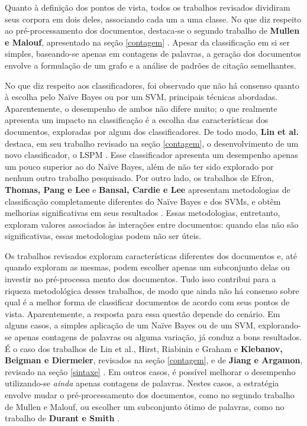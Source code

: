 Quanto à definição dos pontos de vista, todos os trabalhos revisados dividiram seus corpora em dois deles, associando cada um a uma classe. No que diz respeito ao pré-processamento dos documentos, destaca-se o segundo trabalho de \textbf{Mullen e Malouf}, apresentado na seção \ref{contagem} \cite{malouf-taking_sides}. Apesar da classificação em si ser simples, baseando-se apenas em contagens de palavras, a geração dos documentos envolve a formulação de um grafo e a análise de padrões de citação semelhantes. 

No que diz respeito aos classificadores, foi observado que não há consenso quanto à escolha pelo Naïve Bayes ou por um SVM, principais técnicas abordadas. Aparentemente, o desempenho de ambos não difere muito; o que realmente apresenta um impacto na classificação é a escolha das características dos documentos, exploradas por algum dos classificadores. De todo modo, \textbf{Lin et al.} destaca, em seu trabalho revisado na seção \ref{contagem}, o desenvolvimento de um novo classificador, o LSPM \cite{lin-et-al2006}. Esse classificador apresenta um desempenho apenas um pouco superior ao do Naïve Bayes, além de não ter sido explorado por nenhum outro trabalho pesquisado. Por outro lado, os trabalhos de Efron, \textbf{Thomas, Pang e Lee} e \textbf{Bansal, Cardie e Lee} apresentam metodologias de classificação completamente diferentes do Naïve Bayes e dos SVMs, e obtêm melhorias significativas em seus resultados \cite{efron} \cite{get-out-the-vote} \cite{disagree}. Essas metodologias, entretanto, exploram valores associados às interações entre documentos: quando elas não são significativas, essas metodologias podem não ser úteis.  

Os trabalhos revisados exploram características diferentes dos documentos e, até quando exploram as mesmas, podem escolher apenas um subconjunto delas ou investir no pré-processa mento dos documentos. Tudo isso contribui para a riqueza metodológica desses trabalhos, de modo que ainda não há consenso sobre qual é a melhor forma de classificar documentos de acordo com seus pontos de vista. Aparentemente, a resposta para essa questão depende do cenário. Em alguns casos, a simples aplicação de um Naïve Bayes ou de um SVM, explorando-se apenas contagens de palavras ou alguma variação, já conduz a bons resultados. É o caso dos trabalhos de Lin et al., Hirst, Riabinin e Graham e \textbf{Klebanov, Beigman e Diermeier}, revisados na seção \ref{contagem}, e de \textbf{Jiang e Argamon}, revisado na seção \ref{sintaxe} \cite{lin-et-al2006} \cite{hirst-et-al} \cite{klebanov} \cite{jiang-argamon}. Em outros casos, é possível melhorar o desempenho utilizando-se \emph{ainda} apenas contagens de palavras. Nestes casos, a estratégia envolve mudar o pré-processamento dos documentos, como no segundo trabalho de Mullen e Malouf, ou escolher um subconjunto ótimo de palavras, como no trabalho de \textbf{Durant e Smith} \cite{malouf-taking_sides} \cite{durant-smith}.


